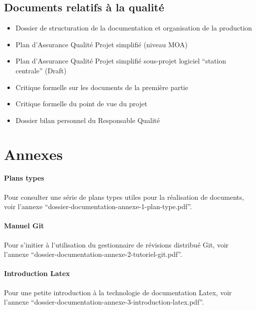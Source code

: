\documentclass[a4paper]{article}
\begin{document}
\subsection{Documents relatifs à la qualité}

\begin{itemize}
\item Dossier de structuration de la documentation et organisation de la production
\item Plan d'Assurance Qualité Projet simplifié (niveau MOA)
\item Plan d'Assurance Qualité Projet simplifié sous-projet logiciel ``station centrale'' (Draft)
\item Critique formelle sur les documents de la première partie
\item Critique formelle du point de vue du projet
\item Dossier bilan personnel du Responsable Qualité
\end{itemize}

\section{Annexes}

\paragraph{Plans types} Pour consulter une série de plans types utiles pour la réalisation de documents, voir l'annexe ``dossier-documentation-annexe-1-plan-type.pdf''.
\paragraph{Manuel Git} Pour s'initier à l'utilisation du gestionnaire de révisions distribué Git, voir l'annexe ``dossier-documentation-annexe-2-tutoriel-git.pdf''.
\paragraph{Introduction Latex} Pour une petite introduction à la technologie de documentation Latex, voir l'annexe ``dossier-documentation-annexe-3-introduction-latex.pdf''.
\end{document}

